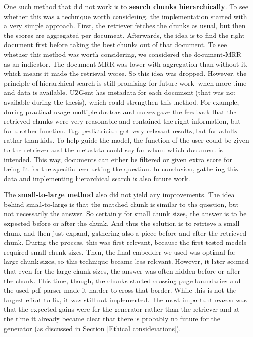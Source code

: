 One such method that did not work is to \textbf{search chunks hierarchically}. To see whether this was a technique worth considering, the implementation started with a very simple approach. First, the retriever fetches the chunks as usual, but then the scores are aggregated per document. Afterwards, the idea is to find the right document first before taking the best chunks out of that document. To see whether this method was worth considering, we considered the document-MRR as an indicator. The document-MRR was lower with aggregation than without it, which means it made the retrieval worse. So this idea was dropped. However, the principle of hierarchical search is still promising for future work, when more time and data is available. UZGent has metadata for each document (that was not available during the thesis), which could strengthen this method. For example, during practical usage multiple doctors and nurses gave the feedback that the retrieved chunks were very reasonable and contained the right information, but for another function. E.g. pediatrician got very relevant results, but for adults rather than kids. To help guide the model, the function of the user could be given to the retriever and the metadata could say for whom which document is intended. This way, documents can either be filtered or given extra score for being fit for the specific user asking the question. In conclusion, gathering this data and implementing hierarchical search is also future work.

The \textbf{small-to-large method} also did not yield any improvements. The idea behind small-to-large is that the matched chunk is similar to the question, but not necessarily the answer. So certainly for small chunk sizes, the answer is to be expected before or after the chunk. And thus the solution is to retrieve a small chunk and then just expand, gathering also a piece before and after the retrieved chunk. During the process, this was first relevant, because the first tested models required small chunk sizes. Then, the final embedder we used was optimal for large chunk sizes, so this technique became less relevant. However, it later seemed that even for the large chunk sizes, the answer was often hidden before or after the chunk. This time, though, the chunks started crossing page boundaries and the used pdf parser made it harder to cross that border. While this is not the largest effort to fix, it was still not implemented. The most important reason was that the expected gains were for the generator rather than the retriever and at the time it already became clear that there is probably no future for the generator (as discussed in Section \ref{Ethical considerations}).

